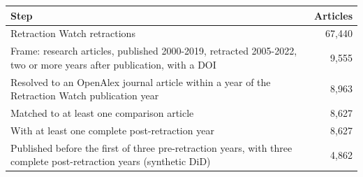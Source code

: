 
\begin{tabular}[t]{p{12cm}r}
\toprule
Step & Articles\\
\midrule
Retraction Watch retractions & 67,440\\
Frame: research articles, published 2000-2019, retracted 2005-2022, two or more years after publication, with a DOI & 9,555\\
Resolved to an OpenAlex journal article within a year of the Retraction Watch publication year & 8,963\\
Matched to at least one comparison article & 8,627\\
With at least one complete post-retraction year & 8,627\\
Published before the first of three pre-retraction years, with three complete post-retraction years (synthetic DiD) & 4,862\\
\bottomrule
\end{tabular}
